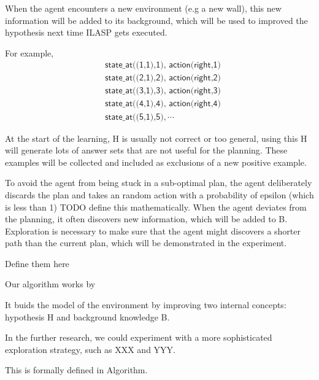When the agent encounters a new environment (e.g a new wall), this new information will be added to its background, which will be used to improved the hypothesis 
next time ILASP gets executed. 

For example, 
\begin{equation*}
\begin{split}
&\textsf{state\_at((1,1),1), action(right,1)}\\
&\textsf{state\_at((2,1),2), action(right,2)}\\
&\textsf{state\_at((3,1),3), action(right,3)}\\
&\textsf{state\_at((4,1),4), action(right,4)}\\
&\textsf{state\_at((5,1),5)}, \cdots
\end{split}
\end{equation*}
    

At the start of the learning, H is usually not correct or too general, using this H will generate lots of answer sets that are not useful for the planning. 
These examples will be collected and included as exclusions of a new positive example. 


To avoid the agent from being stuck in a sub-optimal plan, the agent deliberately discards the plan and takes an random action with a probability of 
epsilon (which is less than 1) TODO define this mathematically. 
When the agent deviates from the planning, it often discovers new information, which will be added to B.
Exploration is necessary to make sure that the agent might discovers a shorter path than the current plan, which will be demonstrated in the experiment. 

Define them here

Our algorithm works by 

It buids the model of the environment by improving two internal concepts: hypothesis H and background knowledge B. 

In the further research, we could experiment with a more sophisticated exploration strategy, such as XXX and YYY. 

This is formally defined in Algorithm. 

